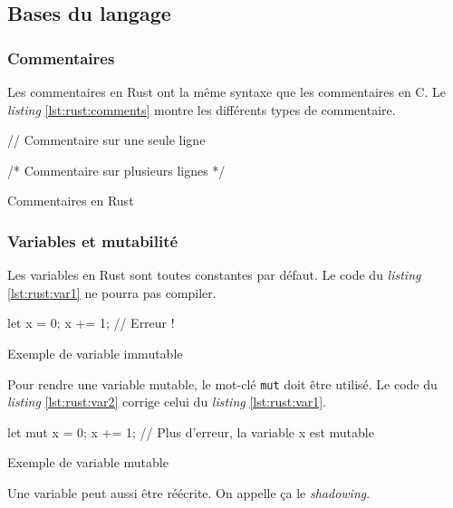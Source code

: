 
\subsection{Bases du langage}
\subsubsection{Commentaires}
Les commentaires en Rust ont la même syntaxe que les commentaires en C. Le \textit{listing}
\ref{lst:rust:comments} montre les différents types de commentaire.

\begin{code}
\begin{rustcode}
// Commentaire sur une seule ligne

/* Commentaire sur
   plusieurs lignes */
\end{rustcode}
\caption{Commentaires en Rust}
\label{lst:rust:comments}
\end{code} \bigbreak

\subsubsection{Variables et mutabilité}
Les variables en Rust sont toutes constantes par défaut. Le code du \textit{listing}
\ref{lst:rust:var1} ne pourra pas compiler.

\begin{code}
\begin{rustcode}
let x = 0;
x += 1; // Erreur !
\end{rustcode}
\caption{Exemple de variable immutable}
\label{lst:rust:var1}
\end{code} \bigbreak

Pour rendre une variable mutable, le mot-clé \texttt{mut} doit être utilisé.
Le code du \textit{listing} \ref{lst:rust:var2} corrige celui du \textit{listing}
\ref{lst:rust:var1}.

\begin{code}
\begin{rustcode}
let mut x = 0;
x += 1; // Plus d'erreur, la variable x est mutable
\end{rustcode}
\caption{Exemple de variable mutable}
\label{lst:rust:var2}
\end{code} \bigbreak

Une variable peut aussi être réécrite. On appelle ça le \textit{shadowing}.

